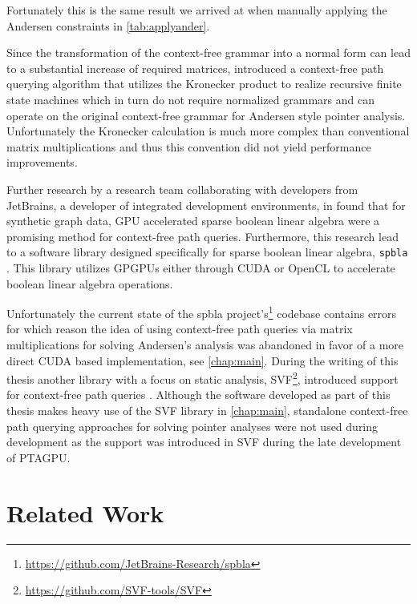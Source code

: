 Fortunately this is the same result we arrived at when manually applying the Andersen constraints in \autoref{tab:applyander}.

Since the transformation of the context-free grammar into a normal form can lead to a substantial increase of required matrices, \cite{orachev2020context} introduced a context-free path querying algorithm that utilizes the Kronecker product to realize recursive finite state machines which in turn do not require normalized grammars and can operate on the original context-free grammar for Andersen style pointer analysis.
Unfortunately the Kronecker calculation is much more complex than conventional matrix multiplications and thus this convention did not yield performance improvements.

Further research by a research team collaborating with developers from JetBrains, a developer of integrated development environments, in \cite{mishin2019evaluation} found that for synthetic graph data, GPU accelerated sparse boolean linear algebra were a promising method for context-free path queries.
Furthermore, this research lead to a software library designed specifically for sparse boolean linear algebra, \verb|spbla| \cite{orachev2021spbla}. This library utilizes GPGPUs either through CUDA or OpenCL to accelerate boolean linear algebra operations.

Unfortunately the current state of the spbla project's\footnote{\url{https://github.com/JetBrains-Research/spbla}} codebase contains errors for which reason the idea of using context-free path queries via matrix multiplications for solving Andersen's analysis was abandoned in favor of a more direct CUDA based implementation, see \autoref{chap:main}.
During the writing of this thesis another library with a focus on static analysis, SVF\footnote{\url{https://github.com/SVF-tools/SVF}}, introduced support for context-free path queries \cite{lei2022taming}. Although the software developed as part of this thesis makes heavy use of the SVF library in \autoref{chap:main}, standalone context-free path querying approaches for solving pointer analyses were not used during development as the support was introduced in SVF during the late development of PTAGPU.
\section{Related Work}
